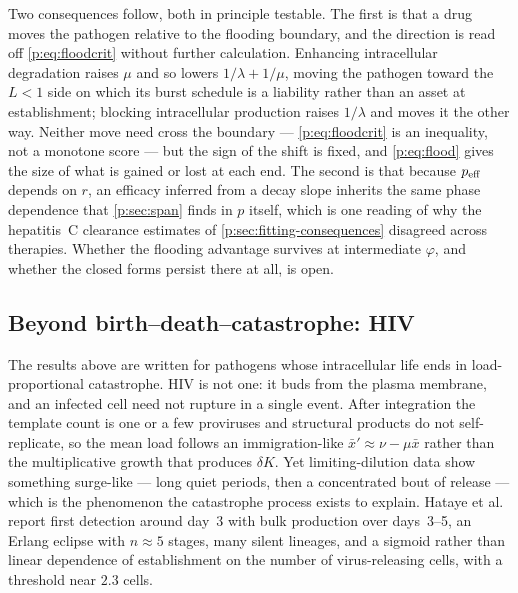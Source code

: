 Two consequences follow, both in principle testable. The first is that a
drug moves the pathogen relative to the flooding boundary, and the direction
is read off \cref{p:eq:floodcrit} without further calculation. Enhancing
intracellular degradation raises $\mu$ and so lowers
$1/\lambda+1/\mu$, moving the pathogen toward the $L<1$ side on which its
burst schedule is a liability rather than an asset at establishment;
blocking intracellular production raises $1/\lambda$ and moves it the other
way. Neither move need cross the boundary --- \cref{p:eq:floodcrit} is an
inequality, not a monotone score --- but the sign of the shift is fixed, and
\cref{p:eq:flood} gives the size of what is gained or lost at each end. The
second is that because $p_{\rm eff}$ depends on $r$, an efficacy inferred
from a decay slope inherits the same phase dependence that
\cref{p:sec:span} finds in $p$ itself, which is one reading of why the
hepatitis~C clearance estimates of \cref{p:sec:fitting-consequences}
disagreed across therapies. Whether the flooding advantage survives at
intermediate $\varphi$, and whether the closed forms persist there at all,
is open.

\subsection{Beyond birth--death--catastrophe: HIV}
\label{p:sec:hiv}

The results above are written for pathogens whose intracellular life ends in
load-proportional catastrophe. HIV is not one: it buds from the plasma
membrane, and an infected cell need not rupture in a single event. After
integration the template count is one or a few proviruses and structural
products do not self-replicate, so the mean load follows an
immigration-like $\bar x'\approx\nu-\mu\bar x$ rather than the multiplicative
growth that produces $\delta K$. Yet limiting-dilution data show something
surge-like --- long quiet periods, then a concentrated bout of release ---
which is the phenomenon the catastrophe process exists to explain. Hataye
et al.\ \cite{hataye2019principles} report first detection around day~3 with
bulk production over days~3--5, an Erlang eclipse with $n\approx5$ stages,
many silent lineages, and a sigmoid rather than linear dependence of
establishment on the number of virus-releasing cells, with a threshold near
$2.3$ cells.

